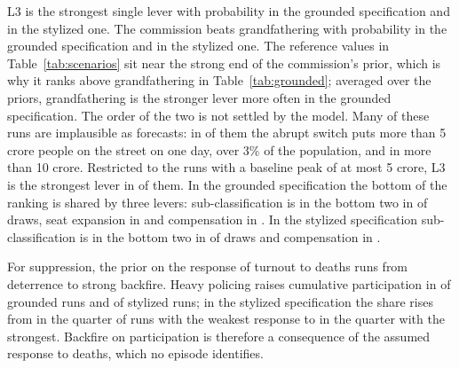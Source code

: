 \documentclass[11pt,a4paper]{article}
\begin{document}
L3 is the strongest single lever with probability \MapGroundedStrongestLThree{} in the grounded specification and \MapStylizedStrongestLThree{} in the stylized one. The commission beats grandfathering with probability \MapGroundedLFiveBeatsLOne{} in the grounded specification and \MapStylizedLFiveBeatsLOne{} in the stylized one. The reference values in Table~\ref{tab:scenarios} sit near the strong end of the commission's prior, which is why it ranks above grandfathering in Table~\ref{tab:grounded}; averaged over the priors, grandfathering is the stronger lever more often in the grounded specification. The order of the two is not settled by the model. Many of these runs are implausible as forecasts: in \PlausibleShareBaselineAboveFiveCrore{} of them the abrupt switch puts more than 5 crore people on the street on one day, over 3\% of the population, and in \PlausibleShareBaselineAboveTenCrore{} more than 10 crore. Restricted to the \PlausibleRunsBelowFiveCrore{} runs with a baseline peak of at most 5 crore, L3 is the strongest lever in \PlausibleLThreeFirstBelowFiveCrore{} of them. In the grounded specification the bottom of the ranking is shared by three levers: sub-classification is in the bottom two in \MapGroundedBottomTwoLFour{} of draws, seat expansion in \MapGroundedBottomTwoLTwo{} and compensation in \MapGroundedBottomTwoLSix. In the stylized specification sub-classification is in the bottom two in \MapStylizedBottomTwoLFour{} of draws and compensation in \MapStylizedBottomTwoLSix.

For suppression, the prior on the response of turnout to deaths runs from deterrence to strong backfire. Heavy policing raises cumulative participation in \MapGroundedBTwoCumulativeHigher{} of grounded runs and \MapStylizedBTwoCumulativeHigher{} of stylized runs; in the stylized specification the share rises from \MapStylizedBTwoCumulativeHigherLowResponse{} in the quarter of runs with the weakest response to \MapStylizedBTwoCumulativeHigherHighResponse{} in the quarter with the strongest. Backfire on participation is therefore a consequence of the assumed response to deaths, which no episode identifies.
\end{document}

